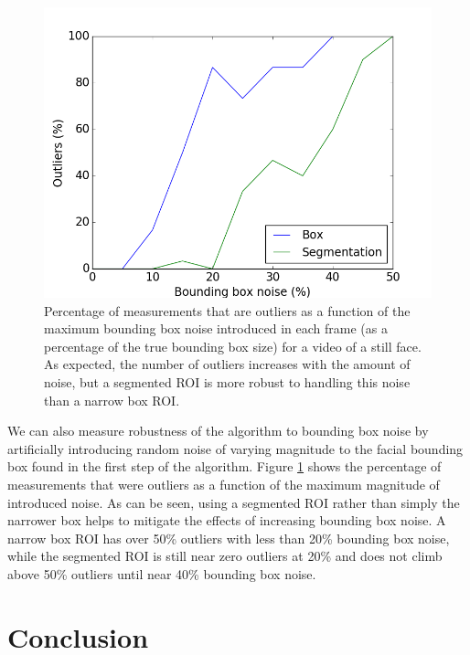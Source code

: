 \documentclass[10pt,twocolumn,letterpaper]{article}
\begin{document}
\begin{figure}
\begin{center}
	\includegraphics[scale=0.4]{figures/bb_noise_outliers.png}
\end{center}
\caption{Percentage of measurements that are outliers as a function of the maximum bounding box noise introduced in each frame (as a percentage of the true bounding box size) for a video of a still face. As expected, the number of outliers increases with the amount of noise, but a segmented ROI is more robust to handling this noise than a narrow box ROI.}
\label{noise_outliers}
\end{figure}

We can also measure robustness of the algorithm to bounding box noise by artificially introducing random noise of varying magnitude to the facial bounding box found in the first step of the algorithm. Figure \ref{noise_outliers} shows the percentage of measurements that were outliers as a function of the maximum magnitude of introduced noise. As can be seen, using a segmented ROI rather than simply the narrower box helps to mitigate the effects of increasing bounding box noise. A narrow box ROI has over 50\% outliers with less than 20\% bounding box noise, while the segmented ROI is still near zero outliers at 20\% and does not climb above 50\% outliers until near 40\% bounding box noise.

\section{Conclusion} \label{conclusion}
\end{document}
